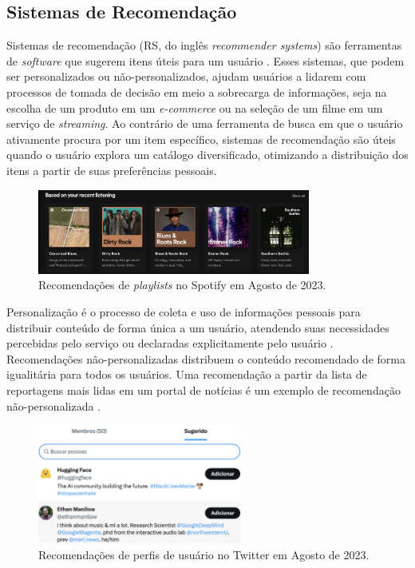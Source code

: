 \subsection{Sistemas de Recomendação}

Sistemas de recomendação (RS, do inglês \textit{recommender systems}) são
ferramentas de \textit{software} que sugerem itens úteis para um usuário
\cite{ricci2010introduction}. Esses sistemas, que podem ser personalizados ou
não-personalizados, ajudam usuários a lidarem com processos de tomada de decisão
em meio a sobrecarga de informações, seja na escolha de um produto em um
\textit{e-commerce} ou na seleção de um filme em um serviço de
\textit{streaming}. Ao contrário de uma ferramenta de busca em que o usuário
ativamente procura por um item específico, sistemas de recomendação são úteis
quando o usuário explora um catálogo diversificado, otimizando a
distribuição dos itens a partir de suas preferências pessoais.

\begin{figure}[ht]
    \centering
    \includegraphics[width=0.8\textwidth]{chapters/chap01/images/spotify.png}
    \caption{Recomendações de \textit{playlists} no Spotify em Agosto de 2023.}
    \label{fig:spotify}
\end{figure}



Personalização é o processo de coleta e uso de informações pessoais para
distribuir conteúdo de forma única a um usuário, atendendo suas necessidades
percebidas pelo serviço ou declaradas explicitamente pelo usuário
\cite{liang2006personalized}. Recomendações não-personalizadas distribuem o
conteúdo recomendado de forma igualitária para todos os usuários. Uma
recomendação a partir da lista de reportagens mais lidas em um portal de
notícias é um exemplo de recomendação não-personalizada
\cite{falk2019practical}.



\begin{figure}[ht]
    \centering
    \includegraphics[width=0.6\textwidth]{chapters/chap01/images/tt.png}
    \caption{Recomendações de perfis de usuário no Twitter em Agosto de 2023.}
    \label{fig:twitter}
\end{figure}

